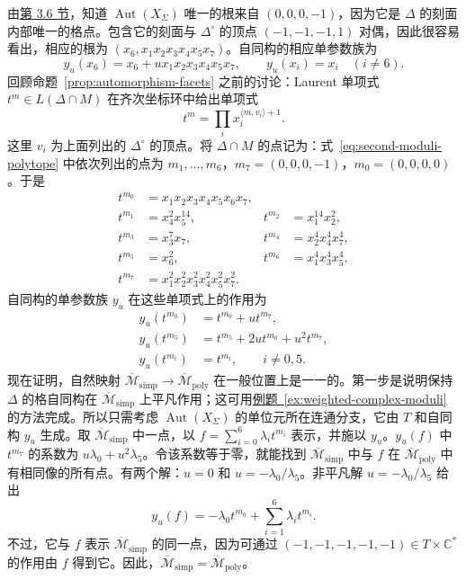 \begin{example}
由\hyperref[sec:toric-automorphisms]{第 3.6 节}，知道 $\operatorname{Aut}(X_\Sigma)$ 唯一的根来自 $(0,0,0,-1)$，因为它是 $\Delta$ 的刻面内部唯一的格点。包含它的刻面与 $\Delta^\circ$ 的顶点 $(-1,-1,-1,1)$ 对偶，因此很容易看出，相应的根为 $(x_6,x_1x_2x_3x_4x_5x_7)$。自同构的相应单参数族为
\[
y_u(x_6)=x_6+u x_1x_2x_3x_4x_5x_7,\qquad y_u(x_i)=x_i\quad(i\ne6).
\]
回顾命题~\ref{prop:automorphism-facets} 之前的讨论：Laurent 单项式 $t^m\in L(\Delta\cap M)$ 在齐次坐标环中给出单项式
\[
t^m=\prod_i x_i^{\langle m,v_i\rangle+1}.
\]
这里 $v_i$ 为上面列出的 $\Delta^\circ$ 的顶点。将 $\Delta\cap M$ 的点记为：式~\eqref{eq:second-moduli-polytope} 中依次列出的点为 $m_1,\ldots,m_6$，$m_7=(0,0,0,-1)$，$m_0=(0,0,0,0)$。于是
\[
\begin{aligned}
t^{m_0}&=x_1x_2x_3x_4x_5x_6x_7,\\
t^{m_1}&=x_4^2x_5^{14},&t^{m_2}&=x_1^{14}x_2^2,\\
t^{m_3}&=x_3^7x_7,&t^{m_4}&=x_2^4x_4^4x_7^4,\\
t^{m_5}&=x_6^2,&t^{m_6}&=x_1^4x_3^4x_5^4,\\
t^{m_7}&=x_1^2x_2^2x_3^2x_4^2x_5^2x_7^2.
\end{aligned}
\]
自同构的单参数族 $y_u$ 在这些单项式上的作用为
\[
\begin{aligned}
y_u(t^{m_0})&=t^{m_0}+u t^{m_7},\\
y_u(t^{m_5})&=t^{m_5}+2u t^{m_0}+u^2t^{m_7},\\
y_u(t^{m_i})&=t^{m_i},\qquad i\ne0,5.
\end{aligned}
\]
现在证明，自然映射 $\overline{\mathcal M}_{\mathrm{simp}}\to\overline{\mathcal M}_{\mathrm{poly}}$ 在一般位置上是一一的。第一步是说明保持 $\Delta$ 的格自同构在 $\overline{\mathcal M}_{\mathrm{simp}}$ 上平凡作用；这可用\hyperref[ex:weighted-complex-moduli]{例题~\ref*{ex:weighted-complex-moduli}} 的方法完成。所以只需考虑 $\operatorname{Aut}(X_\Sigma)$ 的单位元所在连通分支，它由 $T$ 和自同构 $y_u$ 生成。取 $\overline{\mathcal M}_{\mathrm{simp}}$ 中一点，以 $f=\sum_{i=0}^6\lambda_i t^{m_i}$ 表示，并施以 $y_u$。$y_u(f)$ 中 $t^{m_7}$ 的系数为 $u\lambda_0+u^2\lambda_5$。令该系数等于零，就能找到 $\overline{\mathcal M}_{\mathrm{simp}}$ 中与 $f$ 在 $\overline{\mathcal M}_{\mathrm{poly}}$ 中有相同像的所有点。有两个解：$u=0$ 和 $u=-\lambda_0/\lambda_5$。非平凡解 $u=-\lambda_0/\lambda_5$ 给出
\[
y_u(f)=-\lambda_0t^{m_0}+\sum_{i=1}^6\lambda_i t^{m_i}.
\]
不过，它与 $f$ 表示 $\overline{\mathcal M}_{\mathrm{simp}}$ 的同一点，因为可通过 $(-1,-1,-1,-1,-1)\in T\times\mathbb C^*$ 的作用由 $f$ 得到它。因此，$\overline{\mathcal M}_{\mathrm{simp}}=\overline{\mathcal M}_{\mathrm{poly}}$。


\end{example}
